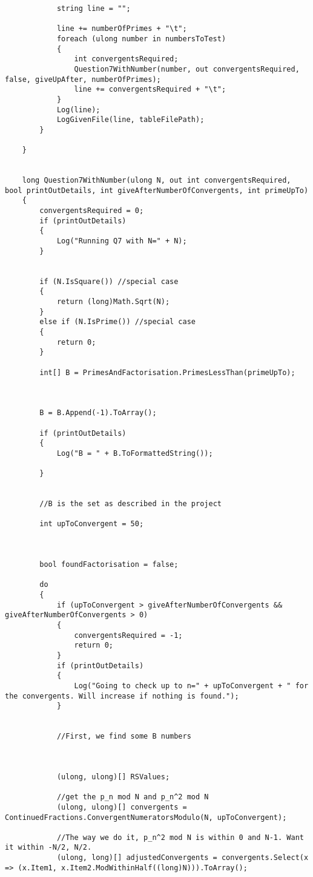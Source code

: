 \documentclass{article}
\begin{document}
\begin{lstlisting}
			string line = "";
			
			line += numberOfPrimes + "\t";
			foreach (ulong number in numbersToTest)
			{
				int convergentsRequired;
				Question7WithNumber(number, out convergentsRequired, false, giveUpAfter, numberOfPrimes);
				line += convergentsRequired + "\t";
			}
			Log(line);
			LogGivenFile(line, tableFilePath);
		}
		
	}
	
	
	long Question7WithNumber(ulong N, out int convergentsRequired, bool printOutDetails, int giveAfterNumberOfConvergents, int primeUpTo)
	{
		convergentsRequired = 0;
		if (printOutDetails)
		{
			Log("Running Q7 with N=" + N);
		}
		
		
		if (N.IsSquare()) //special case
		{
			return (long)Math.Sqrt(N);
		}
		else if (N.IsPrime()) //special case
		{
			return 0;
		}
		
		int[] B = PrimesAndFactorisation.PrimesLessThan(primeUpTo);
		
		
		
		B = B.Append(-1).ToArray();
		
		if (printOutDetails)
		{
			Log("B = " + B.ToFormattedString());
			
		}
		
		
		//B is the set as described in the project
		
		int upToConvergent = 50;
		
		
		
		bool foundFactorisation = false;
		
		do
		{
			if (upToConvergent > giveAfterNumberOfConvergents && giveAfterNumberOfConvergents > 0)
			{
				convergentsRequired = -1;
				return 0;
			}
			if (printOutDetails)
			{
				Log("Going to check up to n=" + upToConvergent + " for the convergents. Will increase if nothing is found.");
			}
			
			
			//First, we find some B numbers
			
			
			
			(ulong, ulong)[] RSValues;
			
			//get the p_n mod N and p_n^2 mod N
			(ulong, ulong)[] convergents = ContinuedFractions.ConvergentNumeratorsModulo(N, upToConvergent);
			
			//The way we do it, p_n^2 mod N is within 0 and N-1. Want it within -N/2, N/2.
			(ulong, long)[] adjustedConvergents = convergents.Select(x => (x.Item1, x.Item2.ModWithinHalf((long)N))).ToArray();
			
			
			

\end{lstlisting}
\end{document}
